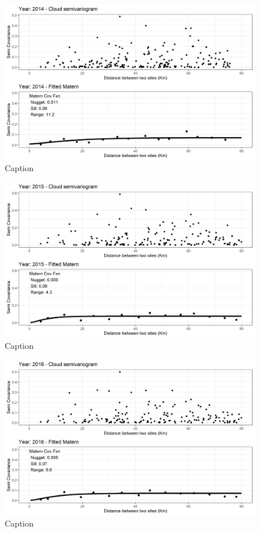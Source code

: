 \begin{figure}
    \centering
    \includegraphics{Figures/EmpiricalVariograms/Empirical_Variogram_2014.png}
    \caption{Caption}
    \label{fig:my_label}
\end{figure}

\begin{figure}
    \centering
    \includegraphics{Figures/EmpiricalVariograms/Empirical_Variogram_2015.png}
    \caption{Caption}
    \label{fig:my_label}
\end{figure}

\begin{figure}
    \centering
    \includegraphics{Figures/EmpiricalVariograms/Empirical_Variogram_2016.png}
    \caption{Caption}
    \label{fig:my_label}
\end{figure}

